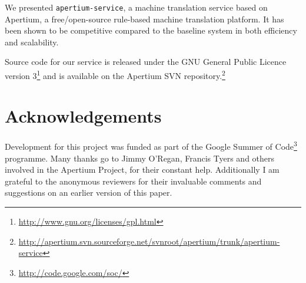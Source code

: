 \documentclass[11pt]{article}
\begin{document}
We presented {\tt\small apertium-service}, a machine translation service based on Apertium, a free/open-source rule-based machine translation platform. It has been shown to be competitive compared to the baseline system in both efficiency and scalability.

Source code for our service is released under the GNU General Public Licence version 3\footnote{\url{http://www.gnu.org/licenses/gpl.html}} and is available on the Apertium SVN repository.\footnote{{\small\url{http://apertium.svn.sourceforge.net/svnroot/apertium/trunk/apertium-service}}}

\section*{Acknowledgements}

Development for this project was funded as part of the Google Summer of Code\footnote{\url{http://code.google.com/soc/}} programme.
Many thanks go to Jimmy O'Regan, Francis Tyers and others involved in the Apertium Project, for their constant help. Additionally I am grateful to the anonymous reviewers for their invaluable comments and suggestions on an earlier version of this paper.



\end{document}
